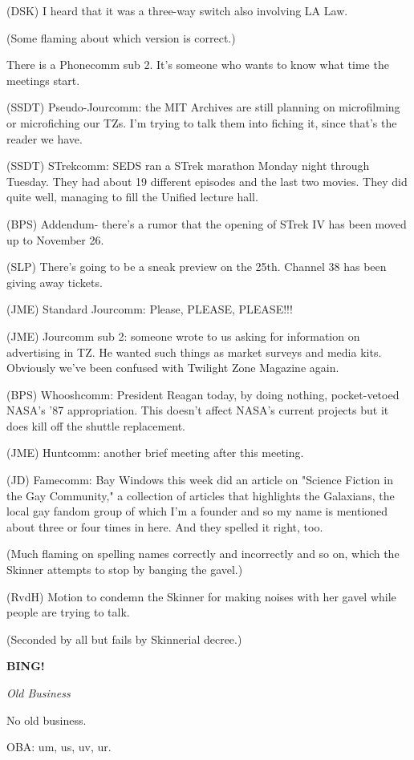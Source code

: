 \documentclass[12pt]{article}
\newcommand{\bing}{{\bf BING!} }
\newcommand{\goto}[1]{\bing \vskip 12pt \centerline{{\em{#1}}}}
\begin{document}
(DSK) I heard that it was a three-way switch also involving LA Law.

(Some flaming about which version is correct.)

There is a Phonecomm sub 2. It's someone who wants to know what time the meetings start.

(SSDT) Pseudo-Jourcomm: the MIT Archives are still planning on microfilming or microfiching our TZs. I'm trying to talk them into fiching it, since that's the reader we have.

(SSDT) STrekcomm: SEDS ran a STrek marathon Monday night through Tuesday. They had about 19 different episodes and the last two movies. They did quite well, managing to fill the Unified lecture hall.

(BPS) Addendum- there's a rumor that the opening of STrek IV has been moved up to November 26.

(SLP) There's going to be a sneak preview on the 25th. Channel 38 has been giving away tickets.

(JME) Standard Jourcomm: Please, PLEASE, PLEASE!!!

(JME) Jourcomm sub 2: someone wrote to us asking for information on advertising in TZ. He wanted such things as market surveys and media kits. Obviously we've been confused with Twilight Zone Magazine again.

(BPS) Whooshcomm: President Reagan today, by doing nothing, pocket-vetoed NASA's '87 appropriation. This doesn't affect NASA's current projects but it does kill off the shuttle replacement.

(JME) Huntcomm: another brief meeting after this meeting.

(JD) Famecomm: Bay Windows this week did an article on "Science Fiction in the Gay Community," a collection of articles that highlights the Galaxians, the local gay fandom group of which I'm a founder and so my name is mentioned about three or four times in here. And they spelled it right, too.

(Much flaming on spelling names correctly and incorrectly and so on, which the Skinner attempts to stop by banging the gavel.)

(RvdH) Motion to condemn the Skinner for making noises with her gavel while people are trying to talk.

(Seconded by all but fails by Skinnerial decree.)

\goto{Old Business}

No old business.

OBA: um, us, uv, ur.
\end{document}
